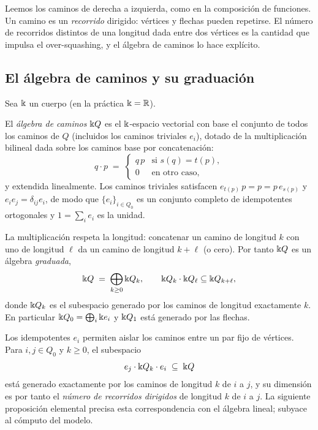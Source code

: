 Leemos los caminos de derecha a izquierda, como en la composición de funciones. Un
camino es un \emph{recorrido} dirigido: vértices y flechas pueden repetirse.
El número de recorridos distintos de una longitud dada entre dos vértices es la
cantidad que impulsa el over-squashing, y el álgebra de caminos lo hace explícito.

\subsection{El álgebra de caminos y su graduación}

Sea $\Bbbk$ un cuerpo (en la práctica $\Bbbk=\mathbb{R}$).

\begin{definition}
El \emph{álgebra de caminos} $\Bbbk Q$ es el $\Bbbk$-espacio vectorial con base el conjunto
de todos los caminos de $Q$ (incluidos los caminos triviales $e_i$), dotado de la
multiplicación bilineal dada sobre los caminos base por concatenación:
\[
  q\cdot p \;=\;
  \begin{cases}
    q\,p & \text{si } s(q)=t(p),\\[2pt]
    0 & \text{en otro caso,}
  \end{cases}
\]
y extendida linealmente. Los caminos triviales satisfacen $e_{t(p)}\,p=p=p\,e_{s(p)}$ y
$e_ie_j=\delta_{ij}e_i$, de modo que $\{e_i\}_{i\in Q_0}$ es un conjunto completo de
idempotentes ortogonales y $1=\sum_{i}e_i$ es la unidad.
\end{definition}

La multiplicación respeta la longitud: concatenar un camino de longitud $k$ con
uno de longitud $\ell$ da un camino de longitud $k+\ell$ (o cero). Por tanto $\Bbbk Q$ es un
álgebra \emph{graduada},
\[
  \Bbbk Q \;=\; \bigoplus_{k\ge 0}\Bbbk Q_k,
  \qquad \Bbbk Q_k\cdot \Bbbk Q_\ell \subseteq \Bbbk Q_{k+\ell},
\]
donde $\Bbbk Q_k$ es el subespacio generado por los caminos de longitud exactamente $k$. En
particular $\Bbbk Q_0=\bigoplus_i \Bbbk e_i$ y $\Bbbk Q_1$ está generado por las flechas.

Los idempotentes $e_i$ permiten aislar los caminos entre un par fijo de vértices.
Para $i,j\in Q_0$ y $k\ge 0$, el subespacio
\[
  e_j\cdot \Bbbk Q_k\cdot e_i \;\subseteq\; \Bbbk Q
\]
está generado exactamente por los caminos de longitud $k$ de $i$ a $j$, y su dimensión es
por tanto el \emph{número de recorridos dirigidos} de longitud $k$ de $i$ a $j$. La
siguiente proposición elemental precisa esta correspondencia con el álgebra lineal;
subyace al cómputo del modelo.

